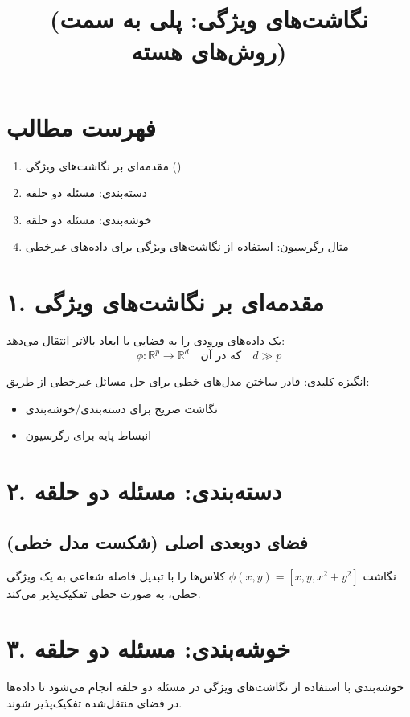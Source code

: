 \documentclass{article}
\title{\lr{Feature Maps: Bridging to Kernel Methods} \\ (نگاشت‌های ویژگی: پلی به سمت روش‌های هسته)}
\author{}
\date{}
\begin{document}
\maketitle

\section*{فهرست مطالب}
\begin{enumerate}
    \item مقدمه‌ای بر نگاشت‌های ویژگی ()
    \item دسته‌بندی: مسئله دو حلقه
    \item خوشه‌بندی: مسئله دو حلقه
    \item مثال رگرسیون: استفاده از نگاشت‌های ویژگی برای داده‌های غیرخطی
\end{enumerate}

\newpage

\section*{۱. مقدمه‌ای بر نگاشت‌های ویژگی}
یک  داده‌های ورودی را به فضایی با ابعاد بالاتر انتقال می‌دهد:
\[
\phi: \mathbb{R}^p \to \mathbb{R}^d \quad \text{که در آن} \quad d \gg p
\]

انگیزه کلیدی: قادر ساختن مدل‌های خطی برای حل مسائل غیرخطی از طریق:
\begin{itemize}
    \item نگاشت صریح برای دسته‌بندی/خوشه‌بندی
    \item انبساط پایه برای رگرسیون
\end{itemize}

\section*{۲. دسته‌بندی: مسئله دو حلقه}
\subsection*{فضای دوبعدی اصلی (شکست مدل خطی)}
نگاشت $\phi(x,y) = [x, y, x^2 + y^2]$ کلاس‌ها را با تبدیل فاصله شعاعی به یک ویژگی خطی، به صورت خطی تفکیک‌پذیر می‌کند.

\section*{۳. خوشه‌بندی: مسئله دو حلقه}
خوشه‌بندی با استفاده از نگاشت‌های ویژگی در مسئله دو حلقه انجام می‌شود تا داده‌ها در فضای منتقل‌شده تفکیک‌پذیر شوند.
\end{document}
